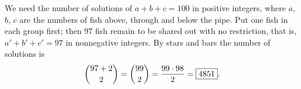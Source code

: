 We need the number of solutions of $a+b+c=100$ in positive integers, where $a$, $b$, $c$ are the numbers of fish above, through and below the pipe. Put one fish in each group first; then $97$ fish remain to be shared out with no restriction, that is, $a'+b'+c'=97$ in nonnegative integers. By stars and bars the number of solutions is
\[
\dbinom{97+2}{2}=\dbinom{99}{2}=\dfrac{99\cdot98}{2}=\boxed{4851}.
\]
